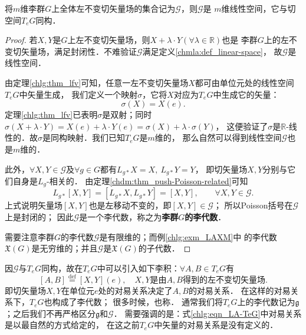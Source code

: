 \begin{theorem}\label{chlg:thm_lfvls}
    将$m$维李群$G$上全体左不变切矢量场的集合记为$\mathscr{G}$，则$\mathscr{G}$是
    $m$维线性空间，它与切空间$T_eG$同构．
\end{theorem}
\begin{proof}
    若$X,Y$是$G$上左不变切矢量场，则$X+\lambda\cdot Y(\forall \lambda \in \mathbb{R})$也是
    李群$G$上的左不变切矢量场，满足封闭性．不难验证$\mathscr{G}$满足定义\ref{chmla:def_linear-space}，
    故$\mathscr{G}$是线性空间．
    
    由定理\ref{chlg:thm_lfv}可知，任意一左不变切矢量场$X$都可由单位元处的线性空间$T_eG$中矢量生成，
    我们定义一个映射$\sigma$，它将$X$对应为$T_eG$中生成它的矢量：
    \begin{equation}
        \sigma (X) = X(e).
    \end{equation}
    定理\ref{chlg:thm_lfv}已表明$\sigma$是双射；同时$\sigma (X+\lambda \cdot Y)
    = X(e)+\lambda\cdot Y(e)=\sigma(X)+\lambda\cdot\sigma(Y)$，
    这便验证了$\sigma$是$\mathbb{R}$-线性的．故$\sigma$是同构映射．我们已知$T_eG$是$m$维的，
    那么自然可以得到线性空间$\mathscr{G}$也是$m$维的．
    
    此外，$\forall X,Y\in \mathscr{G}$及$\forall g\in G$都有$L_{g*}X=X,\ L_{g*}Y=Y$，
    即切矢量场$X,Y$分别与它们自身是$L_g$-相关的．
    由定理\ref{chdm:thm_push-Poisson-related}可知  %
    \begin{equation}\label{chlg:eqn_LgXY}
        L_{g*}[X,Y]=[L_{g*}X, L_{g*}Y]=[X,Y], \qquad \forall X,Y \in \mathscr{G}.
    \end{equation}
    上式说明矢量场$[X,Y]$也是左移动不变的，即$[X,Y]\in \mathscr{G}$；
    所以Poisson括号在$\mathscr{G}$上是封闭的；
    因此$\mathscr{G}$是一个李代数，称之为{\heiti \bfseries 李群$G$的李代数}．
    
    需要注意李群$G$的李代数$\mathscr{G}$是有限维的；而例\ref{chlg:exm_LAXM}中
    的李代数$\mathfrak{X}(G)$是无穷维的；并且$\mathscr{G}$是$\mathfrak{X}(G)$的子代数．
\end{proof}


因$\mathscr{G}$与$T_eG$同构，故在$T_eG$中可以引入如下李积：$\forall A, B \in T_eG$有
\begin{equation}\label{chlg:eqn_LA-TeG}
    [A, B] \overset{\mathrm {def}}{=} [X,Y](e), \quad 
    X,Y \text{是由}A,B \text{得到的左不变切矢量场}.
\end{equation}
即切矢量场$X,Y$在单位元$e$处的对易关系决定了$A, B$的对易关系．
在这样的对易关系下，$T_eG$也构成了李代数；
很多时候，也称．
通常我们将$T_eG$上的李代数记为$\mathfrak{g}$；之后我们不再严格区分$\mathfrak{g}$和$\mathscr{G}$．
需要强调的是：式\eqref{chlg:eqn_LA-TeG}中对易关系是以最自然的方式给定的，
在这之前$T_eG$中矢量的对易关系是没有定义的．

